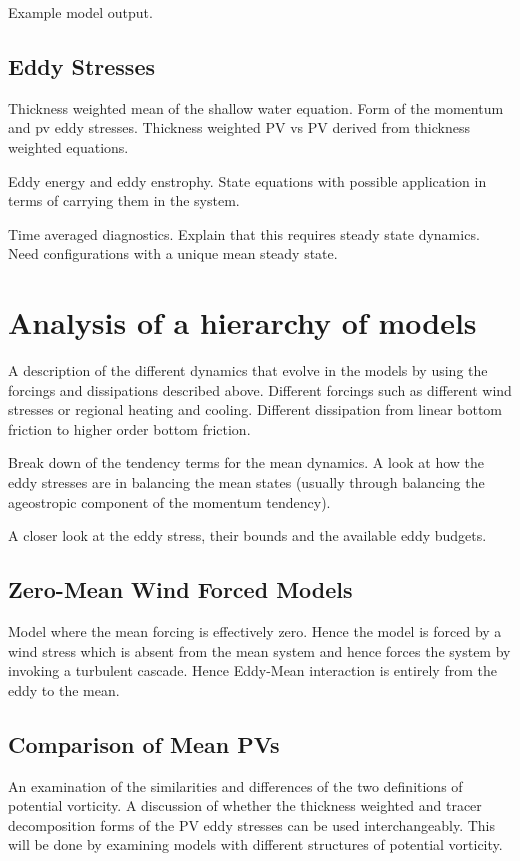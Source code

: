 \documentclass[10pt,a4paper]{article}
\begin{document}
Example model output.

\subsection{Eddy Stresses}

Thickness weighted mean of the shallow water
equation. Form of the momentum and pv eddy stresses.
Thickness weighted PV vs PV derived from thickness 
weighted equations.

Eddy energy and eddy enstrophy. State equations with 
possible application in terms of carrying them in the system.

Time averaged diagnostics. Explain that this 
requires steady state dynamics. Need configurations
with a unique mean steady state.

\section{Analysis of a hierarchy of models}

A description of the different dynamics that evolve
in the models by using the forcings and 
dissipations described above. Different forcings
such as different wind stresses or regional heating
and cooling. Different dissipation from
linear bottom friction to higher order bottom
friction.

Break down of the tendency terms for the mean
dynamics. A look at how the eddy stresses are 
in balancing the mean states (usually through
balancing the ageostropic component of the
momentum tendency).

A closer look at the eddy stress, their bounds 
and the available eddy budgets.

\subsection{Zero-Mean Wind Forced Models}

Model where the mean forcing is effectively zero. 
Hence the model is forced by a wind stress which is
absent from the mean system and hence forces the
system by 
invoking a turbulent cascade. Hence Eddy-Mean
interaction is entirely from the eddy to the mean.

\subsection{Comparison of Mean PVs}

An examination of the similarities and differences
of the two definitions of potential vorticity. 
A discussion of whether the thickness
weighted and tracer decomposition forms of the
PV eddy stresses can be used interchangeably.
This will be done by examining models with
different structures of potential vorticity.
\end{document}
